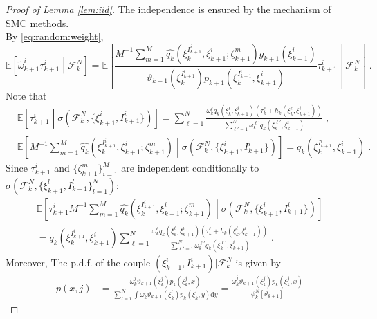 \documentclass[12pt]{article}
\newcommand{\rmd}{\mathrm{d}}
\newcommand{\eqsp}{\;}
\newcommand{\1}{\mathrm{1}}
\newcommand{\qk}{q_{k}}
\begin{document}
\begin{proof}[Proof of Lemma \ref{lem:iid}]
The independence is ensured by the mechanism of SMC methods.\\
By \eqref{eq:random:weight},
\[
\mathbb{E}\left[\tilde{\omega}^i_{k+1}\tau^{i}_{k+1}\middle| \mathcal{F}_k^{N}\right] = \mathbb{E}\left[\frac{M^{-1}\sum_{m=1}^M \widehat{\qk}(\xi_{k}^{I^{i}_{k+1}}, \xi^{i}_{k+1};\zeta^m_{k+1})g_{k+1}(\xi^{i}_{k+1})}{\vartheta_{k+1}(\xi^{I^{i}_{k+1}}_{k}) p_{k+1}(\xi_{k}^{I^{i}_{k+1}},\xi^{i}_{k+1})}\tau^{i}_{k+1}\middle| \mathcal{F}_k^{N}\right]\eqsp.
\]
Note that
\begin{align*}
&\mathbb{E}\left[\tau^{i}_{k+1}\middle|\sigma\left(\mathcal{F}_k^{N},\{\xi_{k+1}^i,I_{k+1}^i\}\right)\right]
 = \sum_{\ell=1}^N\frac{\omega_k^{\ell} \qk(\xi_{k}^{\ell}, \xi^{i}_{k+1}) \left(\tau^{\ell}_k + h_{k}(\xi_{k}^{\ell},\xi^{i}_{k+1})\right)}{\sum_{\ell'=1}^N\omega_k^{\ell'} \qk(\xi_{k}^{\ell'},\xi^{i}_{k+1})}\eqsp,\\
&\mathbb{E} \left[ M^{-1}\sum_{m=1}^M \widehat{\qk}(\xi_{k}^{I^{i}_{k+1}},\xi^{i}_{k+1};\zeta^m_{k+1}) \middle| \sigma \left(\mathcal{F}_k^{N},\{\xi_{k+1}^i,I^{i}_{k+1}\}\right)\right]
 = \qk(\xi_{k}^{I^{i}_{k+1}},\xi^{i}_{k+1})\eqsp.
\end{align*}
Since $\tau^{i}_{k+1}$ and $\{\zeta^m_{k+1}\}_{i=1}^M$ are independent conditionally to $\sigma\left(\mathcal{F}_k^{N},\{\xi_{k+1}^l, I_{k+1}^l\}_{l=1}^N\right)$:
\begin{multline*}
\mathbb{E}\left[\tau^{i}_{k+1}M^{-1}\sum_{m=1}^M \widehat{\qk} (\xi_{k}^{I^{i}_{k+1}},\xi^{i}_{k+1};\zeta^m_{k+1})\middle|\sigma\left(\mathcal{F}_k^{N},\{\xi_{k+1}^i,I_{k+1}^i\} \right)\right]\\
 = q_k(\xi_{k}^{I^{i}_{k+1}},\xi^{i}_{k+1})\sum_{\ell=1}^N\frac{\omega_k^{\ell} \qk (\xi_{k}^{\ell},\xi^{i}_{k+1})\left(\tau^{\ell}_k + h_{k}(\xi_{k}^{\ell},\xi^{i}_{k+1})\right)}{\sum_{\ell'=1}^N\omega_k^{\ell'} \qk (\xi_{k}^{\ell'},\xi^{i}_{k+1})}\eqsp.
\end{multline*}
Moreover, The p.d.f. of the couple $(\xi_{k+1}^i,I_{k+1}^i)\vert \mathcal{F}_k^N$ is given by
\begin{align*}
p(x,j) &= \frac{\omega_k^j\vartheta_{k+1}(\xi_k^j)p_k(\xi_k^j,x)}{\sum_{l=1}^N\int \omega_k^l\vartheta_{k+1}(\xi_k^l)p_k(\xi_k^l,y)\rmd y}=\frac{\omega_k^j\vartheta_{k+1}(\xi_k^j)p_k(\xi_k^j,x)}{\phi_k^N[\vartheta_{k+1}]}

\end{align*}
\end{proof}
\end{document}
